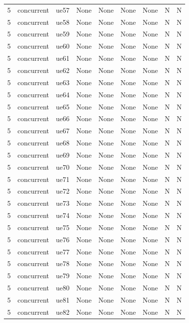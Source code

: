 \begin{table}[ht]
\begin{tabular}{|c|c|c|c|c|c|c|c|c|}
5 & concurrent & ue57 & None & None & None & None & N & N \\
5 & concurrent & ue58 & None & None & None & None & N & N \\
5 & concurrent & ue59 & None & None & None & None & N & N \\
5 & concurrent & ue60 & None & None & None & None & N & N \\
5 & concurrent & ue61 & None & None & None & None & N & N \\
5 & concurrent & ue62 & None & None & None & None & N & N \\
5 & concurrent & ue63 & None & None & None & None & N & N \\
5 & concurrent & ue64 & None & None & None & None & N & N \\
5 & concurrent & ue65 & None & None & None & None & N & N \\
5 & concurrent & ue66 & None & None & None & None & N & N \\
5 & concurrent & ue67 & None & None & None & None & N & N \\
5 & concurrent & ue68 & None & None & None & None & N & N \\
5 & concurrent & ue69 & None & None & None & None & N & N \\
5 & concurrent & ue70 & None & None & None & None & N & N \\
5 & concurrent & ue71 & None & None & None & None & N & N \\
5 & concurrent & ue72 & None & None & None & None & N & N \\
5 & concurrent & ue73 & None & None & None & None & N & N \\
5 & concurrent & ue74 & None & None & None & None & N & N \\
5 & concurrent & ue75 & None & None & None & None & N & N \\
5 & concurrent & ue76 & None & None & None & None & N & N \\
5 & concurrent & ue77 & None & None & None & None & N & N \\
5 & concurrent & ue78 & None & None & None & None & N & N \\
5 & concurrent & ue79 & None & None & None & None & N & N \\
5 & concurrent & ue80 & None & None & None & None & N & N \\
5 & concurrent & ue81 & None & None & None & None & N & N \\
5 & concurrent & ue82 & None & None & None & None & N & N \\

\end{tabular}
\end{table}
